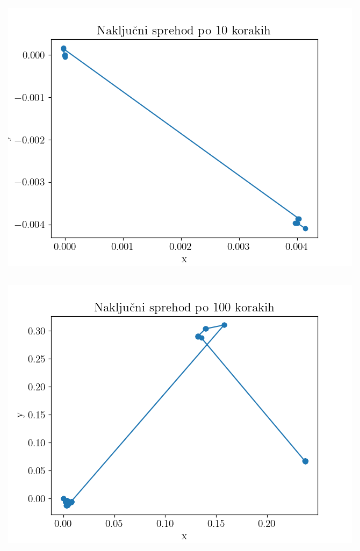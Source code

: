 \documentclass[12pt]{article}
\begin{document}
\begin{figure}
    \centering
    \begin{subfigure}{0.49\textwidth}
        \includegraphics[width=\textwidth]{Random10.png}
    \end{subfigure}
    \begin{subfigure}{0.49\textwidth}
        \includegraphics[width=\textwidth]{Random100.png}
    \end{subfigure}
    \begin{subfigure}{0.49\textwidth}

\end{subfigure}
\end{figure}
\end{document}
